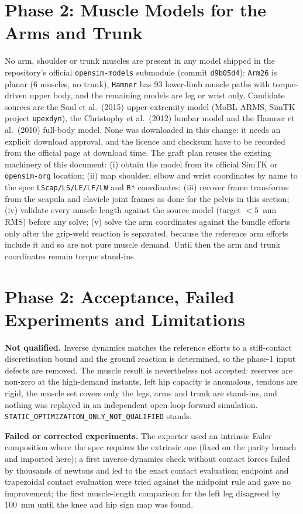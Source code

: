 \documentclass[11pt,a4paper]{article}
\begin{document}
\section{Phase 2: Muscle Models for the Arms and Trunk}
No arm, shoulder or trunk muscles are present in any model shipped in the repository's official \texttt{opensim-models} submodule (commit \texttt{d9b05d4}): \texttt{Arm26} is planar (6 muscles, no trunk), \texttt{Hamner} has 93 lower-limb muscle paths with torque-driven upper body, and the remaining models are leg or wrist only. Candidate sources are the Saul et al.\ (2015) upper-extremity model (MoBL-ARMS, SimTK project \texttt{upexdyn}), the Christophy et al.\ (2012) lumbar model and the Hamner et al.\ (2010) full-body model. None was downloaded in this change: it needs an explicit download approval, and the licence and checksum have to be recorded from the official page at download time. The graft plan reuses the existing machinery of this document: (i) obtain the model from its official SimTK or \texttt{opensim-org} location; (ii) map shoulder, elbow and wrist coordinates by name to the spec \texttt{LScap/LS/LE/LF/LW} and \texttt{R*} coordinates; (iii) recover frame transforms from the scapula and clavicle joint frames as done for the pelvis in this section; (iv) validate every muscle length against the source model (target $<5$~mm RMS) before any solve; (v) solve the arm coordinates against the bundle efforts only after the grip-weld reaction is separated, because the reference arm efforts include it and so are not pure muscle demand. Until then the arm and trunk coordinates remain torque stand-ins.

\section{Phase 2: Acceptance, Failed Experiments and Limitations}
\textbf{Not qualified.} Inverse dynamics matches the reference efforts to a stiff-contact discretisation bound and the ground reaction is determined, so the phase-1 input defects are removed. The muscle result is nevertheless not accepted: reserves are non-zero at the high-demand instants, left hip capacity is anomalous, tendons are rigid, the muscle set covers only the legs, arms and trunk are stand-ins, and nothing was replayed in an independent open-loop forward simulation. \texttt{STATIC\_OPTIMIZATION\_ONLY\_NOT\_QUALIFIED} stands.

\textbf{Failed or corrected experiments.} The exporter used an intrinsic Euler composition where the spec requires the extrinsic one (fixed on the parity branch and imported here); a first inverse-dynamics check without contact forces failed by thousands of newtons and led to the exact contact evaluation; endpoint and trapezoidal contact evaluation were tried against the midpoint rule and gave no improvement; the first muscle-length comparison for the left leg disagreed by 100~mm until the knee and hip sign map was found.
\end{document}
